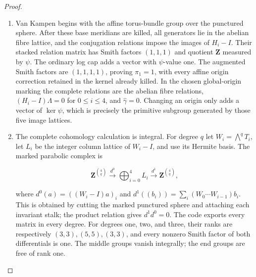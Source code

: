 \begin{proof}
\begin{enumerate}[label=\arabic*.]
\par\medskip\noindent\textbf{Integral topology.}\enspace Put \(H_i=T_i^{-t}\) on the
homology lattice \(\Lambda\).  The images of \(H_i-I\) have
Smith factors \((1),(1),(1),(1),(1,1)\).  The primitive toric
collapses kill exactly these vanishing lattices.  We first fix
an actual global origin for the auxiliary untwisted family, before
the ordinary logarithmic transformation.  The restriction
\(M|_O\) has degree \(R\cdot O-O^2=4\).  Choose its section
with divisor \(4t_c\).  Its nonzero values over the other base
points give an origin in the quotient.  Near \(t_c\), its line
character is \(V=q^4\) times a holomorphic unit.  Subtracting
four gamma periods changes this to the nonvanishing bounded
character \(\lambda^{-4}e^{-8\pi iC}\) times a unit and changes
the source coordinate by the bounded translation \(-4\Gamma\).
It therefore extends in the dense torus of the cusp component.
This proves that the origin is global, including all five singular
fibres.  Every base meridian based at this origin contracts in
its local filling.

\item Van Kampen begins with the affine torus-bundle group over the
punctured sphere.  After these base meridians are killed, all
generators lie in the abelian fibre lattice, and the conjugation
relations impose the images of \(H_i-I\).  Their stacked relation
matrix has Smith factors \((1,1,1)\) and quotient \(\mathbf Z\)
measured by \(\psi\).  The ordinary log cap adds a vector with
\(\psi\)-value one.  The augmented Smith factors are
\((1,1,1,1)\), proving \(\pi_1=1\), with every affine origin
correction retained in the kernel already killed.  In the chosen
global-origin marking the complete relations are the abelian
fibre relations, \((H_i-I)\Lambda=0\) for \(0\leq i\leq4\),
and \(\widehat\gamma=0\).  Changing an origin only adds a vector
of \(\ker\psi\), which is precisely the primitive subgroup
generated by those five image lattices.

\item The complete cohomology calculation is integral.  For degree \(q\)
let \(W_i=\bigwedge^qT_i\), let \(L_i\) be the integer column
lattice of \(W_i-I\), and use its Hermite basis.  The marked
parabolic complex is

\[
 \mathbf Z^{\binom4q}\xrightarrow{d^0}
 \bigoplus_{i=0}^4 L_i\xrightarrow{d^1}
 \mathbf Z^{\binom4q},
\]

where \(d^0(a)=((W_i-I)a)_i\) and
\(d^1((b_i))=\sum_i(W_0\cdots W_{i-1})b_i\).
This is obtained by cutting the marked punctured sphere and
attaching each invariant stalk; the product relation gives
\(d^1d^0=0\).  The code exports every matrix in every degree.
For degrees one, two, and three, their ranks are respectively
\((3,3),(5,5),(3,3)\), and every nonzero Smith factor of
both differentials is one.  The middle groups vanish integrally;
the end groups are free of rank one.


\end{enumerate}
\end{proof}
